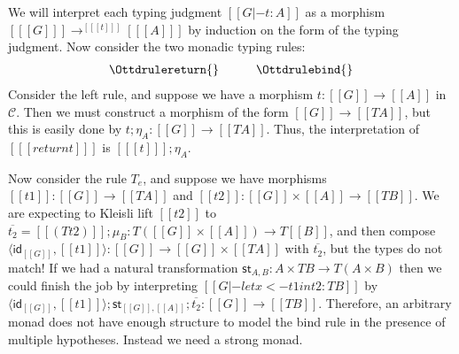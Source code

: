 \documentclass{article}
\let\mto\to
\let\to\relax
\newcommand{\to}{\rightarrow}
\newcommand{\cat}[1]{\mathcal{#1}}
\newcommand{\id}[0]{\mathsf{id}}
\begin{document}
We will interpret each typing judgment $[[G |- t : A]]$ as a morphism
$[[ [G] ]] \mto^{[[ [t] ]]} [[ [A] ]]$ by induction on the form of the
typing judgment. Now consider the two monadic typing rules:
\[
\begin{array}{lll}
  \Ottdrulereturn{} & \quad & \Ottdrulebind{}
\end{array}
\]
Consider the left rule, and suppose we have a morphism $t : [[G]] \mto
[[A]]$ in $\cat{C}$.  Then we must construct a morphism of the form
$[[G]] \mto [[T A]]$, but this is easily done by $t;\eta_A : [[G]]
\mto [[T A]]$.  Thus, the interpretation of $[[ [return t] ]]$ is
$[[ [t] ]];\eta_A$.

Now consider the rule $T_e$, and suppose we have morphisms $[[t1]] :
[[G]] \mto [[T A]]$ and $[[t2]] : [[G]] \times [[A]] \mto [[T B]]$.
We are expecting to Kleisli lift $[[t2]]$ to $\overline{t_2} = [[(T
    t2)]];\mu_B : T ([[G]] \times [[A]]) \mto T [[B]]$, and then
compose $\langle \id_{[[G]]} , [[t1]] \rangle : [[G]] \mto [[G]]
\times [[T A]]$ with $\overline{t_2}$, but the types do not match!  If
we had a natural transformation $\mathsf{st}_{A,B} : A \times T B \mto
T(A \times B)$ then we could finish the job by interpreting
$[[G |- let x <- t1 in t2 : T B]]$ by
$\langle \id_{[[G]]} , [[t1]] \rangle;\mathsf{st}_{[[G]],[[A]]};\overline{t_2} : [[G]] \mto [[T B]]$.
Therefore, an arbitrary monad does not have enough structure to model
the bind rule in the presence of multiple hypotheses.  Instead we need
a strong monad.
\end{document}
